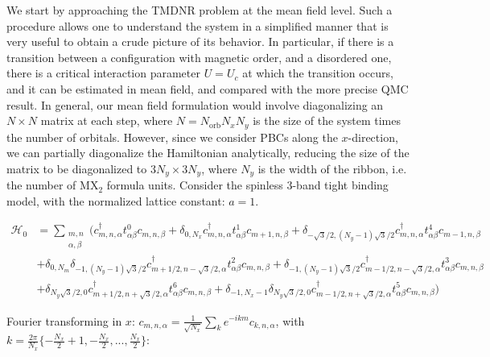 We start by approaching the \acs{TMDNR} problem at the mean field level.
Such a procedure allows one to understand the system in a simplified manner that is very useful to obtain a crude picture of its behavior.
In particular, if there is a transition between a configuration with magnetic order, and a disordered one, there is a critical interaction parameter $U = U_c$ at which the transition occurs, and it can be estimated in mean field, and compared with the more precise \acs{QMC} result.
In general, our mean field formulation would involve diagonalizing an $N \times N$ matrix at each step, where $N = N_{\text{orb}} N_x N_y$ is the size of the system times the number of orbitals.
However, since we consider \acs{PBC}s along the $x$-direction, we can partially diagonalize  the Hamiltonian analytically, reducing the size of the matrix to be diagonalized to $3 N_y \times 3 N_y$, where $N_y$ is the width of the ribbon, i.e. the number of $\text{M}\text{X}_2$ formula units.
Consider the spinless 3-band tight binding model, with the normalized lattice constant: $a = 1$.

\begin{equation}
\begin{split}
\mathcal{H}_0 &= \sum_{\substack{m, n \\ \alpha, \beta}} \bigg( c_{m,n, \alpha}^\dagger t_{\alpha\beta}^0 c_{m, n, \beta} + \delta_{0, N_x}  c_{m,n, \alpha}^\dagger t_{\alpha\beta}^1 c_{m+1, n, \beta} + \delta_{-\sqrt{3}/2, (N_y -1)\sqrt{3}/2}  c_{m,n, \alpha}^\dagger t_{\alpha\beta}^4 c_{m-1, n, \beta} \\
& + \delta_{0, N_m} \delta_{-1, (N_y -1)\sqrt{3}/2} c_{m+1/2,n-\sqrt{3}/2, \alpha}^\dagger t_{\alpha\beta}^2 c_{m, n, \beta} + \delta_{-1, (N_y -1)\sqrt{3}/2} c_{m-1/2,n-\sqrt{3}/2, \alpha}^\dagger t_{\alpha\beta}^3 c_{m, n, \beta} \\
& + \delta_{N_y\sqrt{3}/2, 0} c_{m+1/2,n+\sqrt{3}/2, \alpha}^\dagger t_{\alpha\beta}^6 c_{m, n, \beta} + \delta_{-1, N_x -1} \delta_{N_y\sqrt{3}/2, 0} c_{m-1/2,n+\sqrt{3}/2, \alpha}^\dagger t_{\alpha\beta}^5 c_{m, n, \beta} \bigg)
\end{split}
\end{equation}

Fourier transforming in $x$: $c_{m, n, \alpha} = \frac{1}{\sqrt{N_x}}\sum_{k} e^{-i k m } c_{k, n, \alpha} $, with $k = \frac{2\pi}{N_x} \{ -\frac{N_x}{2} + 1, -\frac{N_x}{2}, ..., \frac{N_x}{2} \}$:

